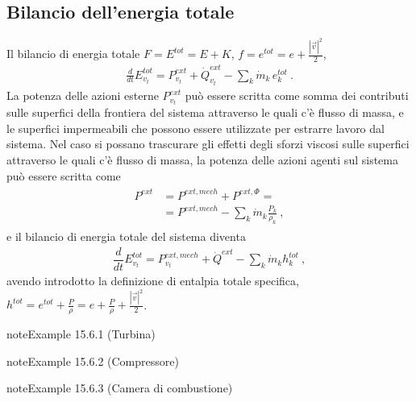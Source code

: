 \documentclass[letterpaper,10pt,italian]{jupyterBook}
\begin{document}
\subsection{Bilancio dell’energia totale}
\label{\detokenize{ch/thermodynamics/principles-open:bilancio-dell-energia-totale}}
\sphinxAtStartPar
Il bilancio di energia totale \(F = E^{tot} = E + K\), \(f = e^{tot} = e + \frac{|\vec{v}|^2}{2}\),
\begin{equation*}
\begin{split}\frac{d}{dt} E^{tot}_{v_t} = P^{ext}_{v_t}  + \dot{Q}^{ext}_{v_t}  - \sum_k \dot{m}_k \, e^{tot}_k \ .\end{split}
\end{equation*}
\sphinxAtStartPar
La potenza delle azioni esterne \(P^{ext}_{v_t}\) può essere scritta come somma dei contributi sulle superfici della frontiera del sistema attraverso le quali c’è flusso di massa, e le superfici impermeabili che possono essere utilizzate per estrarre lavoro dal sistema. Nel caso si possano trascurare gli effetti degli sforzi viscosi sulle superfici attraverso le quali c’è flusso di massa, la potenza delle azioni agenti sul sistema può essere scritta come
\begin{equation*}
\begin{split}\begin{aligned}
  P^{ext} & = P^{ext,mech} + P^{ext,\Phi} = \\
          & = P^{ext,mech} - \sum_{k} \dot{m}_k \frac{P_k}{\rho_k} \ , 
\end{aligned}\end{split}
\end{equation*}
\sphinxAtStartPar
e il bilancio di energia totale del sistema diventa
\begin{equation*}
\begin{split}\dfrac{d}{dt} E^{tot}_{v_t} = P^{ext,mech}_{v_t} + \dot{Q}^{ext} - \sum_k \dot{m}_k h^{tot}_k \ ,\end{split}
\end{equation*}
\sphinxAtStartPar
avendo introdotto la definizione di entalpia totale specifica, \(h^{tot} = e^{tot} + \frac{P}{\rho} = e + \frac{P}{\rho} + \frac{|\vec{v}|^2}{2}\).
\label{ch/thermodynamics/principles-open:thermodynamics:principles:open:ex:turbine}
\begin{sphinxadmonition}{note}{Example 15.6.1 (Turbina)}


\end{sphinxadmonition}
\label{ch/thermodynamics/principles-open:thermodynamics:principles:open:ex:compressor}
\begin{sphinxadmonition}{note}{Example 15.6.2 (Compressore)}


\end{sphinxadmonition}
\label{ch/thermodynamics/principles-open:thermodynamics:principles:open:ex:comb-chamber}
\begin{sphinxadmonition}{note}{Example 15.6.3 (Camera di combustione)}


\end{sphinxadmonition}
\end{document}
